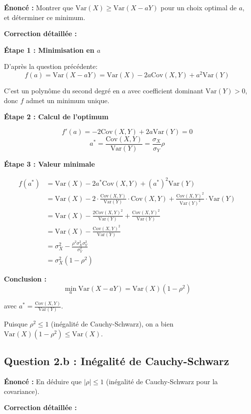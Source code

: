 \documentclass[12pt,a4paper]{article}
\theoremstyle{definition}
\newcommand{\Var}{\mathrm{Var}}
\newcommand{\Cov}{\mathrm{Cov}}
\begin{document}
\textbf{Énoncé :} Montrer que $\Var(X) \geq \Var(X - aY)$ pour un choix optimal de $a$, et déterminer ce minimum.

\textbf{Correction détaillée :}

\textbf{Étape 1 : Minimisation en $a$}

D'après la question précédente:
\[
f(a) = \Var(X - aY) = \Var(X) - 2a\Cov(X,Y) + a^2\Var(Y)
\]

C'est un polynôme du second degré en $a$ avec coefficient dominant $\Var(Y) > 0$, donc $f$ admet un minimum unique.

\textbf{Étape 2 : Calcul de l'optimum}

\[
f'(a) = -2\Cov(X,Y) + 2a\Var(Y) = 0
\]
\[
a^* = \frac{\Cov(X,Y)}{\Var(Y)} = \frac{\sigma_X}{\sigma_Y} \rho
\]

\textbf{Étape 3 : Valeur minimale}

\begin{align*}
f(a^*) &= \Var(X) - 2a^*\Cov(X,Y) + (a^*)^2\Var(Y) \\
&= \Var(X) - 2 \cdot \frac{\Cov(X,Y)}{\Var(Y)} \cdot \Cov(X,Y) + \frac{\Cov(X,Y)^2}{\Var(Y)^2} \cdot \Var(Y) \\
&= \Var(X) - \frac{2\Cov(X,Y)^2}{\Var(Y)} + \frac{\Cov(X,Y)^2}{\Var(Y)} \\
&= \Var(X) - \frac{\Cov(X,Y)^2}{\Var(Y)} \\
&= \sigma_X^2 - \frac{\rho^2 \sigma_X^2 \sigma_Y^2}{\sigma_Y^2} \\
&= \sigma_X^2(1 - \rho^2)
\end{align*}

\textbf{Conclusion :}
\[
\boxed{\min_a \Var(X - aY) = \Var(X)(1 - \rho^2)}
\]

avec $a^* = \frac{\Cov(X,Y)}{\Var(Y)}$.

Puisque $\rho^2 \leq 1$ (inégalité de Cauchy-Schwarz), on a bien $\Var(X)(1-\rho^2) \leq \Var(X)$.

\subsection{Question 2.b : Inégalité de Cauchy-Schwarz}

\textbf{Énoncé :} En déduire que $|\rho| \leq 1$ (inégalité de Cauchy-Schwarz pour la covariance).

\textbf{Correction détaillée :}
\end{document}
